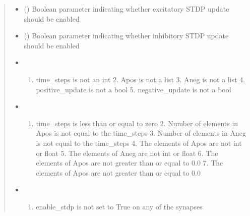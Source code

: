 \documentclass[letterpaper,10pt,english]{sphinxmanual}
\begin{document}
\begin{fulllineitems}
\begin{fulllineitems}
\begin{quote}
\begin{description}
\begin{itemize}
\item {} 
\sphinxAtStartPar
{} () \textendash{} Boolean parameter indicating whether excitatory STDP update should be enabled

\item {} 
\sphinxAtStartPar
{} () \textendash{} Boolean parameter indicating whether inhibitory STDP update should be enabled

\end{itemize}

\begin{itemize}
\item {} 
\sphinxAtStartPar
{} \textendash{} \begin{enumerate}
%
\item {} 
\sphinxAtStartPar
time\_steps is not an int
    2. Apos is not a list
    3. Aneg is not a list
    4. positive\_update is not a bool
    5. negative\_update is not a bool

\end{enumerate}


\item {} 
\sphinxAtStartPar
{} \textendash{} \begin{enumerate}
%
\item {} 
\sphinxAtStartPar
time\_steps is less than or equal to zero
    2. Number of elements in Apos is not equal to the time\_steps
    3. Number of elements in Aneg is not equal to the time\_steps
    4. The elements of Apos are not int or float
    5. The elements of Aneg are not int or float
    6. The elements of Apos are not greater than or equal to 0.0
    7. The elements of Apos are not greater than or equal to 0.0

\end{enumerate}


\item {} 
\sphinxAtStartPar
{} \textendash{} \begin{enumerate}
%
\item {} 
\sphinxAtStartPar
enable\_stdp is not set to True on any of the synapses

\end{enumerate}


\end{itemize}

\end{description}\end{quote}

\end{fulllineitems}


\end{fulllineitems}
\end{document}
